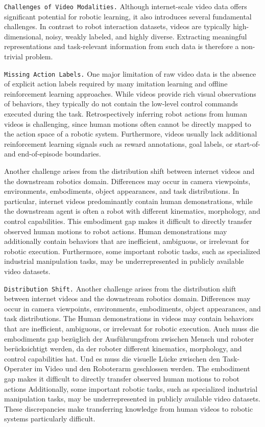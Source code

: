 \texttt{Challenges of Video Modalities.}
Although internet-scale video data offers significant potential for robotic learning, it also introduces several fundamental challenges. In contrast to robot interaction datasets, videos are typically high-dimensional, noisy, weakly labeled, and highly diverse. Extracting meaningful representations and task-relevant information from such data is therefore a non-trivial problem.

\texttt{Missing Action Labels.}
One major limitation of raw video data is the absence of explicit action labels required by many imitation learning and offline reinforcement learning approaches. While videos provide rich visual observations of behaviors, they typically do not contain the low-level control commands executed during the task. Retrospectively inferring robot actions from human videos is challenging, since human motions often cannot be directly mapped to the action space of a robotic system. Furthermore, videos usually lack additional reinforcement learning signals such as reward annotations, goal labels, or start-of- and end-of-episode boundaries.



Another challenge arises from the distribution shift between internet videos and the downstream robotics domain. Differences may occur in camera viewpoints, environments, embodiments, object appearances, and task distributions. In particular, internet videos predominantly contain human demonstrations, while the downstream agent is often a robot with different kinematics, morphology, and control capabilities. This embodiment gap makes it difficult to directly transfer observed human motions to robot actions. Human demonstrations may additionally contain behaviors that are inefficient, ambiguous, or irrelevant for robotic execution. Furthermore, some important robotic tasks, such as specialized industrial manipulation tasks, may be underrepresented in publicly available video datasets.



\texttt{Distribution Shift.}
Another challenge arises from the distribution shift between internet videos and the downstream robotics domain. Differences may occur in camera viewpoints, environments, embodiments, object appearances, and task distributions. The Human demonstrations in videos may contain behaviors that are inefficient, ambiguous, or irrelevant for robotic execution. Auch muss die embodiments gap bezüglich der Ausführungsfrom zwischen Mensch und roboter berücksichtigt werden, da der roboter different kinematics, morphology, and control capabilities hat. Und es muss die visuelle Lücke zwischen den Task-Operater im Video und den Roboterarm geschlossen werden. The embodiment gap makes it difficult to directly transfer observed human motions to robot actions
Additionally, some important robotic tasks, such as specialized industrial manipulation tasks, may be underrepresented in publicly available video datasets. These discrepancies make transferring knowledge from human videos to robotic systems particularly difficult.



